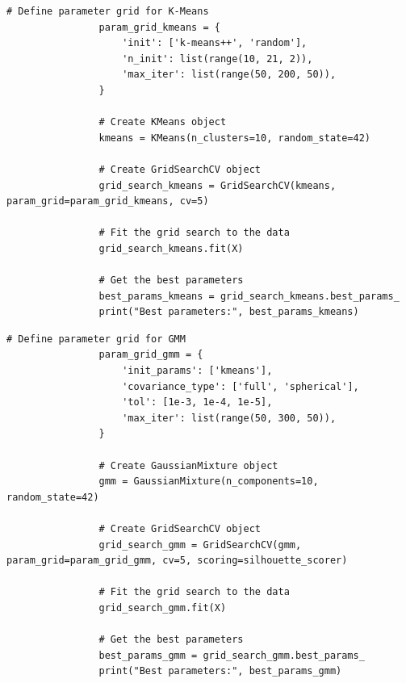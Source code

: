             \begin{lstlisting}[caption={Grid Search for k-Means Clustering}, label={lst:grid_search_kmeans}]
                # Define parameter grid for K-Means
                param_grid_kmeans = {
                    'init': ['k-means++', 'random'],
                    'n_init': list(range(10, 21, 2)),
                    'max_iter': list(range(50, 200, 50)),
                }
                
                # Create KMeans object
                kmeans = KMeans(n_clusters=10, random_state=42)
                
                # Create GridSearchCV object
                grid_search_kmeans = GridSearchCV(kmeans, param_grid=param_grid_kmeans, cv=5)
                
                # Fit the grid search to the data
                grid_search_kmeans.fit(X)
                
                # Get the best parameters
                best_params_kmeans = grid_search_kmeans.best_params_
                print("Best parameters:", best_params_kmeans)
            \end{lstlisting}
            
            \vspace{0.5em}

            \begin{lstlisting}[caption={Grid Search for Gaussian Mixture Model (GMM)}, label={lst:grid_search_gmm}]
                # Define parameter grid for GMM
                param_grid_gmm = {
                    'init_params': ['kmeans'],
                    'covariance_type': ['full', 'spherical'],
                    'tol': [1e-3, 1e-4, 1e-5],
                    'max_iter': list(range(50, 300, 50)),
                }
                
                # Create GaussianMixture object
                gmm = GaussianMixture(n_components=10, random_state=42)
                
                # Create GridSearchCV object
                grid_search_gmm = GridSearchCV(gmm, param_grid=param_grid_gmm, cv=5, scoring=silhouette_scorer)
                
                # Fit the grid search to the data
                grid_search_gmm.fit(X)
                
                # Get the best parameters
                best_params_gmm = grid_search_gmm.best_params_
                print("Best parameters:", best_params_gmm)
            \end{lstlisting}
            
